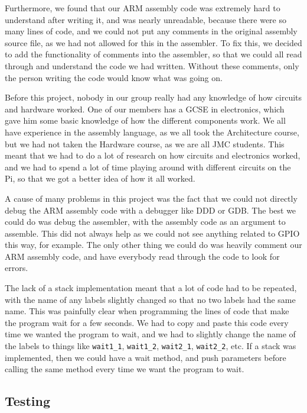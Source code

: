 \documentclass[a4wide, 10pt]{article}
\begin{document}
Furthermore, we found that our ARM assembly code was extremely hard to understand after writing it, and was nearly unreadable, because there were so many lines of code, and we could not put any comments in the original assembly source file, as we had not allowed for this in the assembler. To fix this, we decided to add the functionality of comments into the assembler, so that we could all read through and understand the code we had written. Without these comments, only the person writing the code would know what was going on.

Before this project, nobody in our group really had any knowledge of how circuits and hardware worked. One of our members has a GCSE in electronics, which gave him some basic knowledge of how the different components work. We all have experience in the assembly language, as we all took the Architecture course, but we had not taken the Hardware course, as we are all JMC students. This meant that we had to do a lot of research on how circuits and electronics worked, and we had to spend a lot of time playing around with different circuits on the Pi, so that we got a better idea of how it all worked.

A cause of many problems in this project was the fact that we could not directly debug the ARM assembly code with a debugger like DDD or GDB. The best we could do was debug the assembler, with the assembly code as an argument to assemble. This did not always help as we could not see anything related to GPIO this way, for example. The only other thing we could do was heavily comment our ARM assembly code, and have everybody read through the code to look for errors.

The lack of a stack implementation meant that a lot of code had to be repeated, with the name of any labels slightly changed so that no two labels had the same name. This was painfully clear when programming the lines of code that make the program wait for a few seconds. We had to copy and paste this code every time we wanted the program to wait, and we had to slightly change the name of the labels to things like \texttt{wait1\_1}, \texttt{wait1\_2}, \texttt{wait2\_1}, \texttt{wait2\_2}, etc. If a stack was implemented, then we could have a wait method, and push parameters before calling the same method every time we want the program to wait.

\subsection*{Testing}
\end{document}
